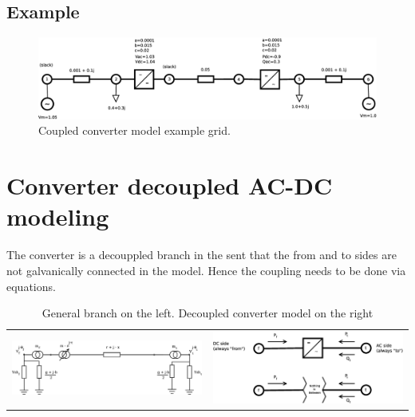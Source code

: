 \documentclass[11pt]{article}
\begin{document}
	\subsection{Example}
	
	\begin{figure}[h!]
		\centering
		\includegraphics[width=1.0\linewidth]{acdc_6bus_diagram_fubm}
		\caption{Coupled converter model example grid.}
		\label{fig:acdc6busdiagram_fubm}
	\end{figure}

	

	\newpage
	\section{Converter decoupled AC-DC modeling}
	
	The converter is a decouppled branch in the sent that the from and to sides are not galvanically connected in the model.
	Hence the coupling needs to be done via equations.
	
	\begin{table}[h!]
	\begin{tabular}{cc} %
		\includegraphics[width=0.6\linewidth]{branch.eps} &
		\includegraphics[width=0.35\linewidth]{decoupled_converter_model.eps} \\
	\end{tabular}
	\caption{General branch on the left. Decoupled converter model on the right}
	\label{table:branch_and_converter}
	\end{table}
	
\end{document}
